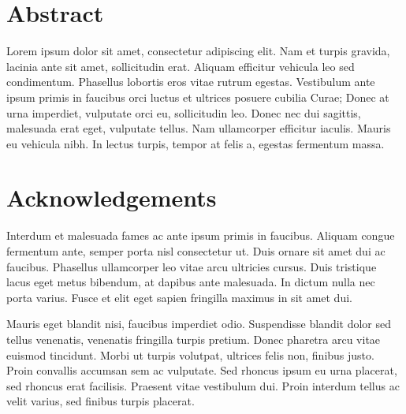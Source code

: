 \documentclass[12pt,a4paper,]{report}
\begin{document}
\hypertarget{abstract}{%
\chapter*{Abstract}\label{abstract}}

Lorem ipsum dolor sit amet, consectetur adipiscing elit. Nam et turpis
gravida, lacinia ante sit amet, sollicitudin erat. Aliquam efficitur
vehicula leo sed condimentum. Phasellus lobortis eros vitae rutrum
egestas. Vestibulum ante ipsum primis in faucibus orci luctus et
ultrices posuere cubilia Curae; Donec at urna imperdiet, vulputate orci
eu, sollicitudin leo. Donec nec dui sagittis, malesuada erat eget,
vulputate tellus. Nam ullamcorper efficitur iaculis. Mauris eu vehicula
nibh. In lectus turpis, tempor at felis a, egestas fermentum massa.

\setcounter{page}{1}

\hypertarget{acknowledgements}{%
\chapter*{Acknowledgements}\label{acknowledgements}}

Interdum et malesuada fames ac ante ipsum primis in faucibus. Aliquam
congue fermentum ante, semper porta nisl consectetur ut. Duis ornare sit
amet dui ac faucibus. Phasellus ullamcorper leo vitae arcu ultricies
cursus. Duis tristique lacus eget metus bibendum, at dapibus ante
malesuada. In dictum nulla nec porta varius. Fusce et elit eget sapien
fringilla maximus in sit amet dui.

Mauris eget blandit nisi, faucibus imperdiet odio. Suspendisse blandit
dolor sed tellus venenatis, venenatis fringilla turpis pretium. Donec
pharetra arcu vitae euismod tincidunt. Morbi ut turpis volutpat,
ultrices felis non, finibus justo. Proin convallis accumsan sem ac
vulputate. Sed rhoncus ipsum eu urna placerat, sed rhoncus erat
facilisis. Praesent vitae vestibulum dui. Proin interdum tellus ac velit
varius, sed finibus turpis placerat.

\newpage


\tableofcontents

\newpage
\listoffigures

\newpage

\listoftables

\newpage
\end{document}
